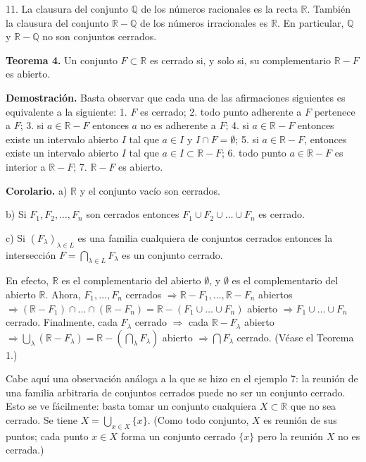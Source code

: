 \documentclass[12pt,oneside]{book}
\begin{document}
11. La clausura del conjunto \(\mathbb{Q}\) de los números racionales es la recta \(\mathbb{R}\). También la clausura del conjunto \(\mathbb{R} - \mathbb{Q}\) de los números irracionales es \(\mathbb{R}\). En particular, \(\mathbb{Q}\) y \(\mathbb{R} - \mathbb{Q}\) no son conjuntos cerrados.

\textbf{Teorema 4.} Un conjunto \(F \subset \mathbb{R}\) es cerrado si, y solo si, su complementario \(\mathbb{R} - F\) es abierto.

\textbf{Demostración.} Basta observar que cada una de las afirmaciones siguientes es equivalente a la siguiente: 
1. \(F\) es cerrado; 
2. todo punto adherente a \(F\) pertenece a \(F\); 
3. si \(a \in \mathbb{R} - F\) entonces \(a\) no es adherente a \(F\); 
4. si \(a \in \mathbb{R} - F\) entonces existe un intervalo abierto \(I\) tal que \(a \in I\) y \(I \cap F = \emptyset\); 
5. si \(a \in \mathbb{R} - F\), entonces existe un intervalo abierto \(I\) tal que \(a \in I \subset \mathbb{R} - F\); 
6. todo punto \(a \in \mathbb{R} - F\) es interior a \(\mathbb{R} - F\); 
7. \(\mathbb{R} - F\) es abierto.

\textbf{Corolario.} a) \(\mathbb{R}\) y el conjunto vacío son cerrados.

b) Si \(F_1, F_2, \dots, F_n\) son cerrados entonces \(F_1 \cup F_2 \cup \dots \cup F_n\) es cerrado.

c) Si \((F_\lambda)_{\lambda \in L}\) es una familia cualquiera de conjuntos cerrados entonces la intersección \(F = \bigcap_{\lambda \in L} F_\lambda\) es un conjunto cerrado.

En efecto, \(\mathbb{R}\) es el complementario del abierto \(\emptyset\), y \(\emptyset\) es el complementario del abierto \(\mathbb{R}\). Ahora, \(F_1, \dots, F_n\) cerrados \(\Rightarrow \mathbb{R} - F_1, \dots, \mathbb{R} - F_n\) abiertos \(\Rightarrow (\mathbb{R} - F_1) \cap \dots \cap (\mathbb{R} - F_n) = \mathbb{R} - (F_1 \cup \dots \cup F_n)\) abierto \(\Rightarrow F_1 \cup \dots \cup F_n\) cerrado. Finalmente, cada \(F_\lambda\) cerrado \(\Rightarrow\) cada \(\mathbb{R} - F_\lambda\) abierto \(\Rightarrow \bigcup_\lambda (\mathbb{R} - F_\lambda) = \mathbb{R} - \left( \bigcap_\lambda F_\lambda \right)\) abierto \(\Rightarrow \bigcap F_\lambda\) cerrado. (Véase el Teorema 1.)

Cabe aquí una observación análoga a la que se hizo en el ejemplo 7: la reunión de una familia arbitraria de conjuntos cerrados puede no ser un conjunto cerrado. Esto se ve fácilmente: basta tomar un conjunto cualquiera \(X \subset \mathbb{R}\) que no sea cerrado. Se tiene \(X = \bigcup_{x \in X} \{x\}\). (Como todo conjunto, \(X\) es reunión de sus puntos; cada punto \(x \in X\) forma un conjunto cerrado \(\{x\}\) pero la reunión \(X\) no es cerrada.)
\end{document}
